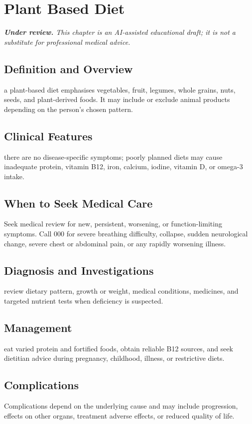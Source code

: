\chapter{Plant Based Diet}

\medskip
\noindent\textit{\textbf{Under review.} This chapter is an AI-assisted educational draft; it is not a substitute for professional medical advice.}

\section*{Definition and Overview}
a plant-based diet emphasises vegetables, fruit, legumes, whole grains, nuts, seeds, and plant-derived foods. It may include or exclude animal products depending on the person's chosen pattern.

\section*{Clinical Features}
there are no disease-specific symptoms; poorly planned diets may cause inadequate protein, vitamin B12, iron, calcium, iodine, vitamin D, or omega-3 intake.

\section*{When to Seek Medical Care}
Seek medical review for new, persistent, worsening, or function-limiting symptoms. Call 000 for severe breathing difficulty, collapse, sudden neurological change, severe chest or abdominal pain, or any rapidly worsening illness.

\section*{Diagnosis and Investigations}
review dietary pattern, growth or weight, medical conditions, medicines, and targeted nutrient tests when deficiency is suspected.

\section*{Management}
eat varied protein and fortified foods, obtain reliable B12 sources, and seek dietitian advice during pregnancy, childhood, illness, or restrictive diets.

\section*{Complications}
Complications depend on the underlying cause and may include progression, effects on other organs, treatment adverse effects, or reduced quality of life.

